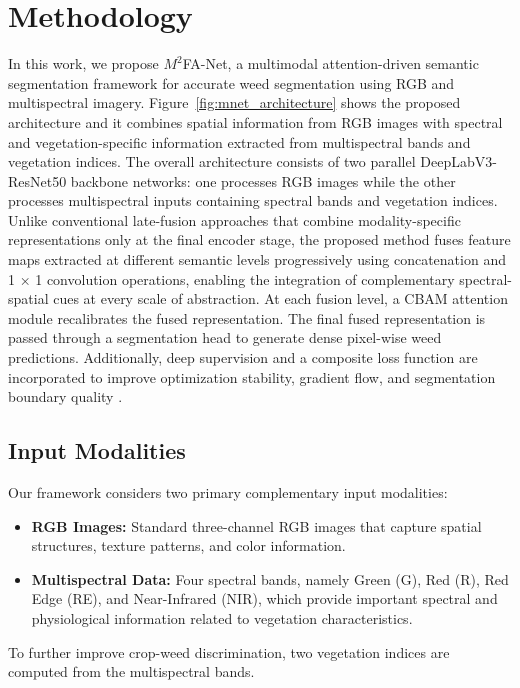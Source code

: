 \documentclass[pdflatex,sn-mathphys-num]{sn-jnl}
\begin{document}
\section{Methodology}
In this work, we propose $M^2$FA-Net, a multimodal attention-driven semantic segmentation framework for accurate weed segmentation using RGB and multispectral imagery. Figure~\ref{fig:mnet_architecture} shows the proposed architecture and it combines spatial information from RGB images with spectral and vegetation-specific information extracted from multispectral bands and vegetation indices. The overall architecture consists of two parallel DeepLabV3-ResNet50 backbone networks: one processes RGB images while the other processes multispectral inputs containing spectral bands and vegetation indices. Unlike conventional late-fusion approaches that combine modality-specific representations only at the final encoder stage, the proposed method fuses feature maps extracted at different semantic levels progressively using concatenation and 1 × 1 convolution operations, enabling the integration of complementary spectral-spatial cues at every scale of abstraction. At each fusion level, a CBAM attention module recalibrates the fused representation\cite{hu2018senet,wang2018nonlocal}. The final fused representation is passed through a segmentation head to generate dense pixel-wise weed predictions. Additionally, deep supervision and a composite loss function are incorporated to improve optimization stability, gradient flow, and segmentation boundary quality \cite{lee2015dsn}.

\subsection{Input Modalities}
Our framework considers two primary complementary input modalities:
\begin{itemize}
    \item \textbf{RGB Images:} Standard three-channel RGB images that capture spatial structures, texture patterns, and color information.
    \item \textbf{Multispectral Data:} Four spectral bands, namely Green (G), Red (R), Red Edge (RE), and Near-Infrared (NIR), which provide important spectral and physiological information related to vegetation characteristics.
\end{itemize}
To further improve crop-weed discrimination, two vegetation indices are computed from the multispectral bands.
\end{document}
